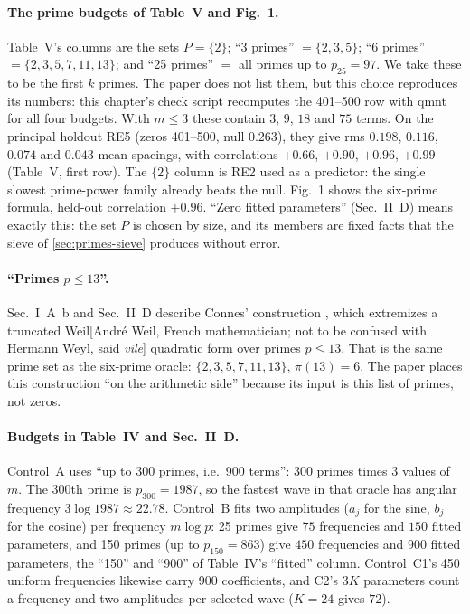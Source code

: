 \paragraph{The prime budgets of Table~V and Fig.~1.} Table~V's columns are the sets $P=\{2\}$; ``3 primes'' $=\{2,3,5\}$; ``6 primes'' $=\{2,3,5,7,11,13\}$; and ``25 primes'' $=$ all primes up to $p_{25}=97$. We take these to be the first $k$ primes. The paper does not list them, but this choice reproduces its numbers: this chapter's check script recomputes the 401--500 row with qmnt for all four budgets. With $m\le3$ these contain $3$, $9$, $18$ and $75$ terms. On the principal holdout RE5 (zeros 401--500, null $0.263$), they give rms $0.198$, $0.116$, $0.074$ and $0.043$ mean spacings, with correlations $+0.66$, $+0.90$, $+0.96$, $+0.99$ (Table~V, first row). The $\{2\}$ column is RE2 used as a predictor: the single slowest prime-power family already beats the null. Fig.~1 shows the six-prime formula, held-out correlation $+0.96$. ``Zero fitted parameters'' (Sec.~II~D) means exactly this: the set $P$ is chosen by size, and its members are fixed facts that the sieve of \cref{sec:primes-sieve} produces without error.

\paragraph{``Primes $p\le13$''.} Sec.~I~A~b and Sec.~II~D describe Connes' construction \cite{connes26}, which extremizes a truncated Weil[Andr\'e Weil, French mathematician; not to be confused with Hermann Weyl, said \emph{vile}] quadratic form over primes $p\le13$. That is the same prime set as the six-prime oracle: $\{2,3,5,7,11,13\}$, $\pi(13)=6$. The paper places this construction ``on the arithmetic side'' because its input is this list of primes, not zeros.

\paragraph{Budgets in Table~IV and Sec.~II~D.} Control~A uses ``up to 300 primes, i.e.\ 900 terms'': $300$ primes times $3$ values of $m$. The 300th prime is $p_{300}=1987$, so the fastest wave in that oracle has angular frequency $3\log1987\approx22.78$. Control~B fits two amplitudes ($a_j$ for the sine, $b_j$ for the cosine) per frequency $m\log p$: 25 primes give $75$ frequencies and $150$ fitted parameters, and 150 primes (up to $p_{150}=863$) give $450$ frequencies and $900$ fitted parameters, the ``150'' and ``900'' of Table~IV's ``fitted'' column. Control~C1's 450 uniform frequencies likewise carry 900 coefficients, and C2's $3K$ parameters count a frequency and two amplitudes per selected wave ($K=24$ gives $72$).


